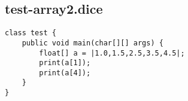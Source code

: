 \subsection{test-array2.dice}
\begin{verbatim}
class test {
	public void main(char[][] args) {
		float[] a = |1.0,1.5,2.5,3.5,4.5|;
		print(a[1]);
		print(a[4]);
	}
}

\end{verbatim}